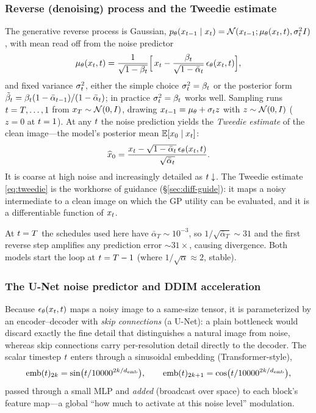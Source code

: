 \subsubsection{Reverse (denoising) process and the Tweedie estimate}
The generative reverse process is Gaussian,
$p_{\theta}(x_{t-1}\mid x_{t})=\mathcal{N}(x_{t-1};\mu_{\theta}(x_{t},t),\sigma_{t}^{2}I)$,
with mean read off from the noise predictor
\begin{equation}
\mu_{\theta}(x_{t},t)=\frac{1}{\sqrt{1-\beta_{t}}}
   \Big[\,x_{t}-\frac{\beta_{t}}{\sqrt{1-\bar{\alpha}_{t}}}\,\epsilon_{\theta}(x_{t},t)\Big],
\label{eq:reverse-mean}
\end{equation}
and fixed variance $\sigma_{t}^{2}$, either the simple choice
$\sigma_{t}^{2}=\beta_{t}$ or the posterior form
$\tilde\beta_{t}=\beta_{t}(1-\bar\alpha_{t-1})/(1-\bar{\alpha}_{t})$; in practice
$\sigma_{t}^{2}=\beta_{t}$ works well. Sampling runs $t=T,\dots,1$ from
$x_{T}\sim\mathcal{N}(0,I)$, drawing $x_{t-1}=\mu_{\theta}+\sigma_{t}z$ with
$z\sim\mathcal{N}(0,I)$ ($z=0$ at $t=1$). At any $t$ the noise prediction yields the
\emph{Tweedie estimate} of the clean image---the model's posterior mean
$\mathbb{E}[x_{0}\mid x_{t}]$:
\begin{equation}
\widehat{x}_{0}=\frac{x_{t}-\sqrt{1-\bar{\alpha}_{t}}\,\epsilon_{\theta}(x_{t},t)}{\sqrt{\bar{\alpha}_{t}}}.
\label{eq:tweedie}
\end{equation}
It is coarse at high noise and increasingly detailed as $t\downarrow$. The
Tweedie estimate \eqref{eq:tweedie} is the workhorse of guidance
(\S\ref{sec:diff-guide}): it maps a noisy intermediate to a clean image on which
the GP utility can be evaluated, and it is a differentiable function of $x_{t}$.

\begin{remark}[$T-1$ start]
At $t=T$ the schedules used here have $\bar\alpha_{T}\!\sim\!10^{-3}$, so
$1/\sqrt{\bar\alpha_{T}}\!\sim\!31$ and the first reverse step amplifies any
prediction error $\sim\!31\times$, causing divergence. Both models start the loop
at $t=T-1$ (where $1/\sqrt{\alpha}\!\approx\!2$, stable).
\end{remark}

\subsubsection{The U-Net noise predictor and DDIM acceleration}
Because $\epsilon_{\theta}(x_{t},t)$ maps a noisy image to a same-size tensor, it is
parameterized by an encoder--decoder with \emph{skip connections} (a U-Net): a
plain bottleneck would discard exactly the fine detail that distinguishes a
natural image from noise, whereas skip connections carry per-resolution detail
directly to the decoder. The scalar timestep $t$ enters through a sinusoidal
embedding (Transformer-style),
\[
\mathrm{emb}(t)_{2k}=\sin\!\big(t/10000^{2k/d_{\mathrm{emb}}}\big),
\qquad
\mathrm{emb}(t)_{2k+1}=\cos\!\big(t/10000^{2k/d_{\mathrm{emb}}}\big),
\]
passed through a small MLP and \emph{added} (broadcast over space) to each block's
feature map---a global ``how much to activate at this noise level'' modulation.

